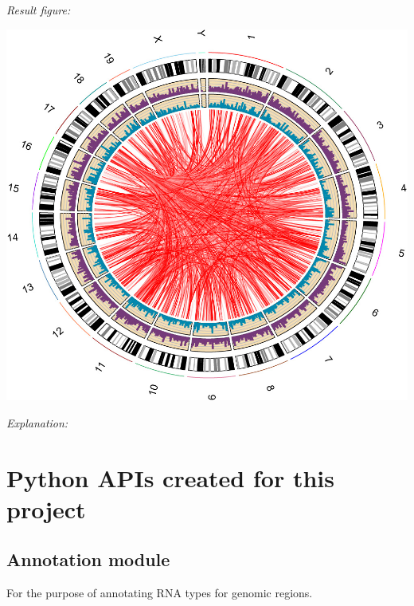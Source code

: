 \documentclass[letterpaper,10pt,english]{sphinxmanual}
\begin{document}
\emph{Result figure:}

\includegraphics{Interactome_GGCG.JPG}

\emph{Explanation:}


\chapter{Python APIs created for this project}
\label{Other_api:python-apis-created-for-this-project}\label{Other_api::doc}

\section{Annotation module}
\label{Other_api:annotation-module}\label{Other_api:module-Annotation}
For the purpose of annotating RNA types for genomic regions.
\end{document}
